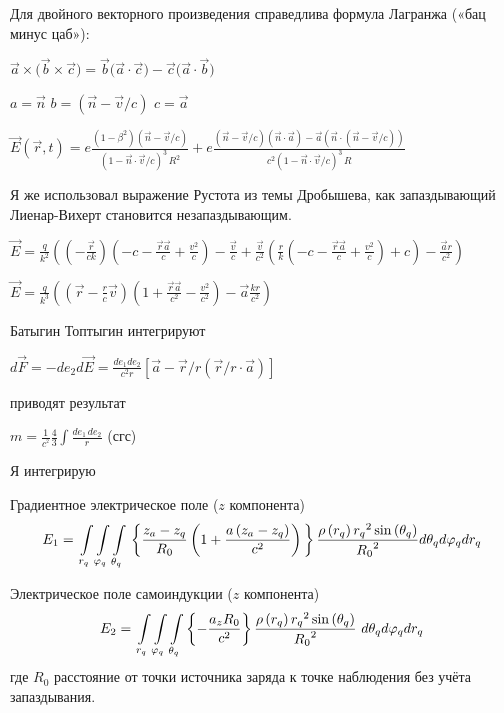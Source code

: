 \documentclass{article}
\begin{document}
Для двойного векторного произведения справедлива формула Лагранжа  («бац минус цаб»):

${\vec {a}}\times \big({\vec {b}}\times {\vec {c}}\big ) = {\vec {b}} \big( {\vec {a}} \cdot {\vec {c}}\big) - {\vec {c}} \big( {\vec {a}} \cdot {\vec {b}}\big)$

$a = \vec{n}$ $b =  \left( \vec{n}-\vec{v}/c\right)$ $c =  \vec{a}$


$\vec{E}\left(\vec{r},t\right) = e \frac{\left(1-\beta^2\right) \left(\vec{n}-\vec{v}/c \right)}{\left(1-\vec{n}\cdot\vec{v}/c\right)^3\,R^2} +  e \frac{ \left( \vec{n}-\vec{v}/c\right) \left( \vec{n} \cdot \vec{a} \right) - \vec{a} \left( \vec{n} \cdot \left( \vec{n}-\vec{v}/c\right)\right)}{c^2 \left(1-\vec{n} \cdot \vec{v}/c \right)^3 \,R }$


Я же использовал выражение Рустота из темы Дробышева, как запаздывающий Лиенар-Вихерт становится незапаздывающим.

$\vec{E} = \frac{q}{k^2}((-\frac{\vec{r}}{c k})(-c - \frac{\vec{r}\vec{a}}{c} + \frac{v^2}{c})-\frac{\vec{v}}{c}+\frac{\vec{v}}{c^2}(\frac{r}{k}(-c - \frac{\vec{r}\vec{a}}{c} + \frac{v^2}{c}) + c) - \frac{\vec{a}r}{c^2})$

$\vec{E} = \frac{q}{k^3}((\vec{r}-\frac{r}{c}\vec{v})(1 + \frac{\vec{r}\vec{a}}{c^2} - \frac{v^2}{c^2}) - \vec{a}\frac{kr}{c^2})$


Батыгин Топтыгин интегрируют

$d\vec{F} = - d e_2 d\vec{E} = \frac{de_1 de_2}{c^2 r} \left[ \vec{a} - \vec{r}/r\left( \vec{r}/r \cdot \vec{a}\right) \right]$


 приводят результат



$m =\frac{1}{{{c}^{^{2}}}}\frac{4}{3}\int\frac{de_1\,de_2}{r}$ (сгс)

Я интегрирую

Градиентное электрическое поле ($z$ компонента)
	\[{E}_{1}=\\
\int\limits_{{{r}_{q}}}\int\limits_{{{\varphi}_{q}}}\int\limits_{{{\theta}_{q}}}\\
\left\{ \frac{z_a-z_q}{{{R}_{0}}}\left( 1+\frac{a\left( {{z}_{a}}-{{z}_{q}} \right)}{c^2} \right) \\
 \right\}\\
\frac{\rho \left( {{r}_{q}} \right){{r}_{q}}^{2}\sin \left( {{\theta }_{q}} \right)}{{{R}_{0}}^{2}}\\
d{{\theta }_{q}}d{{\varphi }_{q}}d{{r}_{q}}\]

Электрическое поле самоиндукции ($z$ компонента)
\[{E}_{2}=\\
\int\limits_{{{r}_{q}}}\int\limits_{{{\varphi}_{q}}}\int\limits_{{{\theta}_{q}}}\\
{\left\{ -\frac{{a_z}R_{0}}{{{c}^{2}}} \right\}\\
\frac{\rho \left( {{r}_{q}} \right){{r}_{q}}^{2}\sin \left( {{\theta }_{q}} \right)}{{{R}_{0}}^{2}}\ }d{{\theta }_{q}}d{{\varphi }_{q}}d{{r}_{q}}\]
где ${R}_{0}$ расстояние от точки источника заряда к точке наблюдения без учёта запаздывания.
\end{document}
